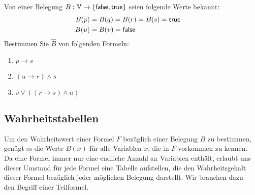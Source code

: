 \begin{ueb}
Von einer Belegung $B:\mathbb{V}\to \{\mathsf{false},\mathsf{true}\}$ seien folgende Werte bekannt:
\begin{align*}
B(p) &= B(q) = B(r) = B(s) =\mathsf{true}\\
B(u) &= B(v) = \mathsf{false}
\end{align*}
Bestimmen Sie $\hat B$ von folgenden Formeln:
\begin{enumerate}
\item $p\to s$
\item $(u\to r)\land s$
\item $v\lor((r\to s)\land u)$
\end{enumerate}
\end{ueb}
\begin{lsg}
\end{lsg}

\subsection*{Wahrheitstabellen}

Um den Wahrheitswert einer Formel $F$ bezüglich einer Belegung $B$ zu bestimmen, gen\"ugt es die Werte $B(x)$ für alle Variablen $x$, die in $F$ vorkommen zu kennen. Da eine Formel immer nur eine endliche Anzahl an Variablen enthält, erlaubt uns dieser Umstand für jede Formel eine Tabelle aufstellen, die den Wahrheitsgehalt dieser Formel bezüglich jeder möglichen Belegung darstellt. Wir brauchen dazu den Begriff einer Teilformel.

